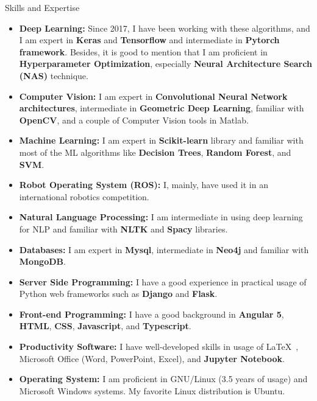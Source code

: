 \documentclass[]{mcdowellcv}
\begin{document}
\begin{cvsection}{Skills and Expertise}
\begin{itemize}
    	    \item \textbf{Deep Learning:} Since 2017, I have been working with these algorithms, and I am expert in \textbf{Keras} and \textbf{Tensorflow} and intermediate in \textbf{Pytorch framework}. Besides, it is good to mention that I am proficient in \textbf{Hyperparameter Optimization}, especially \textbf{Neural Architecture Search (NAS)} technique.
    	    \item \textbf{Computer Vision:} I am expert in \textbf{Convolutional Neural Network architectures}, intermediate in \textbf{Geometric Deep Learning}, familiar with \textbf{OpenCV}, and a couple of Computer Vision tools in Matlab.
    	    \item \textbf{Machine Learning:} I am expert in \textbf{Scikit-learn} library and familiar with most of the ML algorithms like \textbf{Decision Trees}, \textbf{Random Forest}, and \textbf{SVM}.
    	    \item \textbf{Robot Operating System (ROS):} I, mainly, have used it in an international robotics competition.
    	    \item \textbf{Natural Language Processing:} I am intermediate in using deep learning for NLP and familiar with \textbf{NLTK} and \textbf{Spacy} libraries.
            \item \textbf{Databases:} I am expert in \textbf{Mysql}, intermediate in \textbf{Neo4j} and familiar with \textbf{MongoDB}.
            \item \textbf{Server Side Programming:} I have a good experience in practical usage of Python web frameworks such as \textbf{Django} and \textbf{Flask}.
            \item \textbf{Front-end Programming:} I have a good background in \textbf{Angular 5}, \textbf{HTML}, \textbf{CSS}, \textbf{Javascript}, and \textbf{Typescript}.
    	    \item \textbf{Productivity Software:} I have well-developed skills in usage of \LaTeX\ ,  Microsoft Office (Word, PowerPoint, Excel), and \textbf{Jupyter Notebook}.
    	    \item \textbf{Operating System:} I am proficient in GNU/Linux (3.5 years of usage) and Microsoft Windows systems. My favorite Linux distribution is Ubuntu.
    	    \end{itemize}
    
    \end{cvsection}
    
\end{document}
